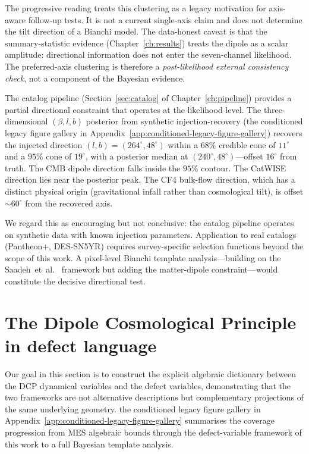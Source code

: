 The progressive reading treats this clustering as a legacy
motivation for axis-aware follow-up tests.  It is not a current
single-axis claim and does not determine the tilt direction of a
Bianchi model.  The data-honest caveat is that the
summary-statistic evidence (Chapter~\ref{ch:results}) treats
the dipole as a scalar amplitude: directional information does
not enter the seven-channel likelihood.  The preferred-axis
clustering is therefore a \emph{post-likelihood external
consistency check}, not a component of the Bayesian evidence.

The catalog pipeline
(Section~\ref{sec:catalog} of Chapter~\ref{ch:pipeline})
provides a partial directional constraint that operates at
the likelihood level.  The three-dimensional
$(\beta, l, b)$ posterior from synthetic injection-recovery
(the conditioned legacy figure gallery in Appendix~\ref{app:conditioned-legacy-figure-gallery}) recovers the injected
direction $(l, b) = (264^\circ, 48^\circ)$ within a
$68\%$ credible cone of $11^\circ$ and a $95\%$ cone of
$19^\circ$, with a posterior median at
$(240^\circ, 48^\circ)$---offset $16^\circ$ from truth.
The CMB dipole direction falls inside the $95\%$ contour.
The CatWISE direction lies near the posterior peak.  The
CF4 bulk-flow direction, which has a distinct physical
origin (gravitational infall rather than cosmological tilt),
is offset $\sim 60^\circ$ from the recovered axis.

We regard this as encouraging but not conclusive: the catalog
pipeline operates on synthetic data with known injection
parameters.  Application to real catalogs (Pantheon+,
DES-SN5YR) requires survey-specific selection functions beyond
the scope of this work.  A pixel-level Bianchi template
analysis---building on the Saadeh~et~al.~\cite{Saadeh2016b}
framework but adding the matter-dipole constraint---would
constitute the decisive directional test.


\section{The Dipole Cosmological Principle in defect language}
\label{sec:DCP-defect}

Our goal in this section is to construct the explicit algebraic
dictionary between the DCP dynamical variables and the defect
variables, demonstrating that the two frameworks are not
alternative descriptions but complementary projections of the
same underlying geometry.
the conditioned legacy figure gallery in Appendix~\ref{app:conditioned-legacy-figure-gallery} summarises the coverage
progression from MES algebraic bounds through the defect-variable
framework of this work to a full Bayesian template analysis.


